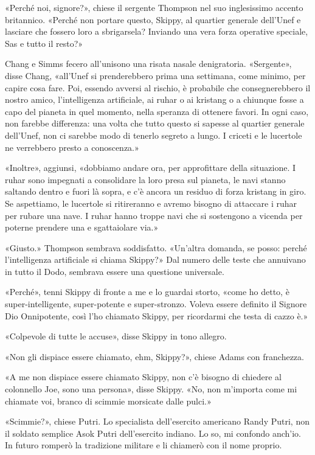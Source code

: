«Perché noi, signore?», chiese il sergente Thompson nel suo inglesissimo
accento britannico. «Perché non portare questo, Skippy, al quartier
generale dell'Unef e lasciare che fossero loro a sbrigarsela? Inviando
una vera forza operative speciale, Sas e tutto il resto?»

Chang e Simms fecero all'unisono una risata nasale denigratoria.
«Sergente», disse Chang, «all'Unef si prenderebbero prima una settimana,
come minimo, per capire cosa fare. Poi, essendo avversi al rischio, è
probabile che consegnerebbero il nostro amico, l'intelligenza
artificiale, ai ruhar o ai kristang o a chiunque fosse a capo del
pianeta in quel momento, nella speranza di ottenere favori. In ogni
caso, non farebbe differenza: una volta che tutto questo si sapesse al
quartier generale dell'Unef, non ci sarebbe modo di tenerlo segreto a
lungo. I criceti e le lucertole ne verrebbero presto a conoscenza.»

«Inoltre», aggiunsi, «dobbiamo andare ora, per approfittare della
situazione. I ruhar sono impegnati a consolidare la loro presa sul
pianeta, le navi stanno saltando dentro e fuori là sopra, e c'è ancora
un residuo di forza kristang in giro. Se aspettiamo, le lucertole si
ritireranno e avremo bisogno di attaccare i ruhar per rubare una nave. I
ruhar hanno troppe navi che si sostengono a vicenda per poterne prendere
una e sgattaiolare via.»

«Giusto.» Thompson sembrava soddisfatto. «Un'altra domanda, se posso:
perché l'intelligenza artificiale si chiama Skippy?» Dal numero delle
teste che annuivano in tutto il Dodo, sembrava essere una questione
universale.

«Perché», tenni Skippy di fronte a me e lo guardai storto, «come ho
detto, è super-intelligente, super-potente e super-stronzo. Voleva
essere definito il Signore Dio Onnipotente, così l'ho chiamato Skippy,
per ricordarmi che testa di cazzo è.»

«Colpevole di tutte le accuse», disse Skippy in tono allegro.

«Non gli dispiace essere chiamato, ehm, Skippy?», chiese Adams con
franchezza.

«A me non dispiace essere chiamato Skippy, non c'è bisogno di chiedere
al colonnello Joe, sono una persona», disse Skippy. «No, non m'importa
come mi chiamate voi, branco di scimmie morsicate dalle pulci.»

«Scimmie?», chiese Putri. Lo specialista dell'esercito americano Randy
Putri, non il soldato semplice Asok Putri dell'esercito indiano. Lo so,
mi confondo anch'io. In futuro romperò la tradizione militare e li
chiamerò con il nome proprio.

